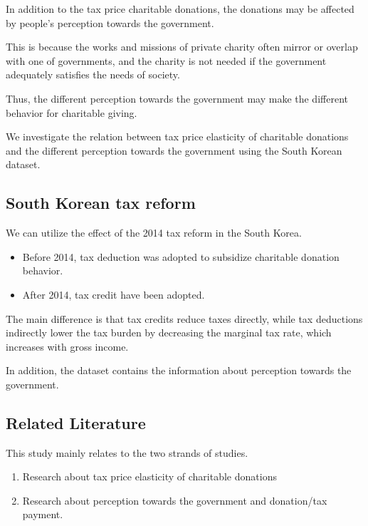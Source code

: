 \documentclass[ review  , 3p ]{elsarticle}
\providecommand{\tightlist}{%
  \setlength{\itemsep}{0pt}\setlength{\parskip}{0pt}}
\begin{document}
  In addition to the tax price charitable donations, the donations may be affected by people's perception towards the government.

  This is because the works and missions of private charity often mirror or overlap with one of governments, and the charity is not needed if the government adequately satisfies the needs of society.

  Thus, the different perception towards the government may make the different behavior for charitable giving.

  We investigate the relation between tax price elasticity of charitable donations and the different perception towards the government using the South Korean dataset.

  \hypertarget{south-korean-tax-reform}{%
  \subsection{South Korean tax reform}\label{south-korean-tax-reform}}

  We can utilize the effect of the 2014 tax reform in the South Korea.

  \begin{itemize}
  \tightlist
  \item
    Before 2014, tax deduction was adopted to subsidize charitable donation behavior.
  \item
    After 2014, tax credit have been adopted.
  \end{itemize}

  The main difference is that tax credits reduce taxes directly, while tax deductions indirectly lower the tax burden by decreasing the marginal tax rate, which increases with gross income.

  In addition, the dataset contains the information about perception towards the government.

  \hypertarget{related-literature}{%
  \subsection{Related Literature}\label{related-literature}}

  This study mainly relates to the two strands of studies.

  \begin{enumerate}
  \def\labelenumi{\arabic{enumi}.}
  \tightlist
  \item
    Research about tax price elasticity of charitable donations
  \item
    Research about perception towards the government and donation/tax payment.
  \end{enumerate}
\end{document}

